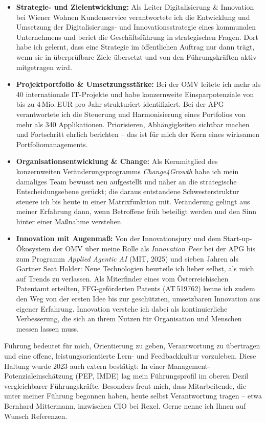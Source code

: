 \documentclass[10.5pt]{article}
\begin{document}
\begin{itemize}\setlength{\itemsep}{1.5pt}\setlength{\parskip}{0pt}
  \item \textbf{Strategie- und Zielentwicklung:} Als Leiter Digitalisierung \& Innovation bei Wiener Wohnen Kundenservice verantwortete ich die Entwicklung und Umsetzung der Digitalisierungs- und Innovationsstrategie eines kommunalen Unternehmens und beriet die Geschäftsführung in strategischen Fragen. Dort habe ich gelernt, dass eine Strategie im öffentlichen Auftrag nur dann trägt, wenn sie in überprüfbare Ziele übersetzt und von den Führungskräften aktiv mitgetragen wird.

  \item \textbf{Projektportfolio \& Umsetzungsstärke:} Bei der OMV leitete ich mehr als 40 internationale IT-Projekte und habe konzernweite Einsparpotenziale von bis zu 4\,Mio.\,EUR pro Jahr strukturiert identifiziert. Bei der APG verantwortete ich die Steuerung und Harmonisierung eines Portfolios von mehr als 340 Applikationen. Priorisieren, Abhängigkeiten sichtbar machen und Fortschritt ehrlich berichten -- das ist für mich der Kern eines wirksamen Portfoliomanagements.

  \item \textbf{Organisationsentwicklung \& Change:} Als Kernmitglied des konzernweiten Veränderungsprogramms \emph{Change4Growth} habe ich mein damaliges Team bewusst neu aufgestellt und näher an die strategische Entscheidungsebene gerückt; die daraus entstandene Schwesterstruktur steuere ich bis heute in einer Matrixfunktion mit. Veränderung gelingt aus meiner Erfahrung dann, wenn Betroffene früh beteiligt werden und den Sinn hinter einer Maßnahme verstehen.

  \item \textbf{Innovation mit Augenmaß:} Von der Innovationsjury und dem Start-up-Ökosystem der OMV über meine Rolle als \emph{Innovation Peer} bei der APG bis zum Programm \emph{Applied Agentic AI} (MIT, 2025) und sieben Jahren als Gartner Seat Holder: Neue Technologien beurteile ich lieber selbst, als mich auf Trends zu verlassen. Als Miterfinder eines vom Österreichischen Patentamt erteilten, FFG-geförderten Patents (AT\,519762) kenne ich zudem den Weg von der ersten Idee bis zur geschützten, umsetzbaren Innovation aus eigener Erfahrung. Innovation verstehe ich dabei als kontinuierliche Verbesserung, die sich an ihrem Nutzen für Organisation und Menschen messen lassen muss.
\end{itemize}

Führung bedeutet für mich, Orientierung zu geben, Verantwortung zu übertragen und eine offene, leistungsorientierte Lern- und Feedbackkultur vorzuleben. Diese Haltung wurde 2023 auch extern bestätigt: In einer Management-Potenzialeinschätzung (PEP, IMDE) lag mein Führungsprofil im oberen Dezil vergleichbarer Führungskräfte. Besonders freut mich, dass Mitarbeitende, die unter meiner Führung begonnen haben, heute selbst Verantwortung tragen -- etwa Bernhard Mittermann, inzwischen CIO bei Rexel. Gerne nenne ich Ihnen auf Wunsch Referenzen.
\end{document}
